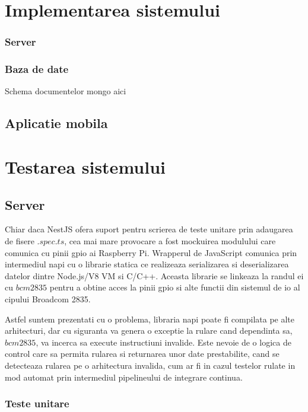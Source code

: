 \section {Implementarea sistemului}

\subsubsection {Server}

\subsubsection {Baza de date}

Schema documentelor mongo aici

\subsection {Aplicatie mobila}

\section {Testarea sistemului}

\subsection {Server}

Chiar daca NestJS ofera suport pentru scrierea de teste unitare prin adaugarea de fisere $.spec.ts$, cea mai mare provocare a fost mockuirea modulului care comunica cu pinii \acrshort{gpio} ai Raspberry Pi. Wrapperul de JavaScript comunica prin intermediul \acrfull{napi} cu o librarie statica ce realizeaza serializarea si deserializarea datelor dintre Node.js/V8 VM si C/C++. Aceasta librarie se linkeaza la randul ei cu $bcm2835$ pentru a obtine acces la pinii \acrshort{gpio} si alte functii din sistemul de \acrfull{io} al cipului Broadcom 2835.

Astfel suntem prezentati cu o problema, libraria \acrshort{napi} poate fi compilata pe alte arhitecturi, dar cu siguranta va genera o exceptie la rulare cand dependinta sa, $bcm2835$, va incerca sa execute instructiuni invalide. Este nevoie de o logica de control care sa permita rularea si returnarea unor date prestabilite, cand se detecteaza rularea pe o arhitectura invalida, cum ar fi in cazul testelor rulate in mod automat prin intermediul pipelineului de integrare continua.

\subsubsection {Teste unitare}


